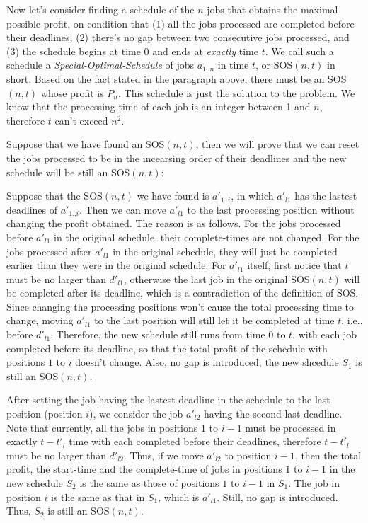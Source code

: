 \documentclass[a4paper, fleqn]{article}
\begin{document}
Now let's consider finding a schedule of the $n$ jobs that obtains the
maximal possible profit, on condition that (1) all the jobs processed
are completed before their deadlines, (2) there's no gap between two
consecutive jobs processed, and (3) the schedule begins at time 0 and
ends at \emph{exactly} time $t$. We call such a schedule a
\emph{Special-Optimal-Schedule} of jobs $a_{1..n}$ in time $t$, or
SOS$(n,t)$ in short. Based on the fact stated in the paragraph above,
there must be an SOS$(n,t)$ whose profit is $P_n$. This schedule is
just the solution to the problem. We know that the processing time of
each job is an integer between 1 and $n$, therefore $t$ can't exceed
$n^2$.

Suppose that we have found an SOS$(n,t)$, then we will prove that we
can reset the jobs processed to be in the incearsing order of their
deadlines and the new schedule will be still an SOS$(n,t)$:

Suppose that the SOS$(n,t)$ we have found is $a'_{1..i}$, in which
$a'_{l1}$ has the lastest deadlines of $a'_{1..i}$. Then we can move
$a'_{l1}$ to the last processing position without changing the profit
obtained. The reason is as follows. For the jobs processed before
$a'_{l1}$ in the original schedule, their complete-times are not
changed. For the jobs processed after $a'_{l1}$ in the original
schedule, they will just be completed earlier than they were in the
original schedule. For $a'_{l1}$ itself, first notice that $t$ must be
no larger than $d'_{l1}$, otherwise the last job in the original
SOS$(n,t)$ will be completed after its deadline, which is a
contradiction of the definition of SOS. Since changing the processing
positions won't cause the total processing time to change, moving
$a'_{l1}$ to the last position will still let it be completed at time
$t$, i.e., before $d'_{l1}$. Therefore, the new schedule still runs
from time 0 to $t$, with each job completed before its deadline, so
that the total profit of the schedule with positions $1$ to $i$
doesn't change.  Also, no gap is introduced, the new shcedule $S_1$ is
still an SOS$(n,t)$.

After setting the job having the lastest deadline in the schedule to
the last position (position $i$), we consider the job $a'_{l2}$ having
the second last deadline. Note that currently, all the jobs in
positions $1$ to $i-1$ must be processed in exactly $t-t'_l$ time with
each completed before their deadlines, therefore $t-t'_l$ must be no
larger than $d'_{l2}$.  Thus, if we move $a'_{l2}$ to position $i-1$,
then the total profit, the start-time and the complete-time of jobs in
positions $1$ to $i-1$ in the new schedule $S_2$ is the same as those
of positions $1$ to $i-1$ in $S_1$. The job in position $i$ is the
same as that in $S_1$, which is $a'_{l1}$. Still, no gap is
introduced. Thus, $S_2$ is still an SOS$(n,t)$.
\end{document}
